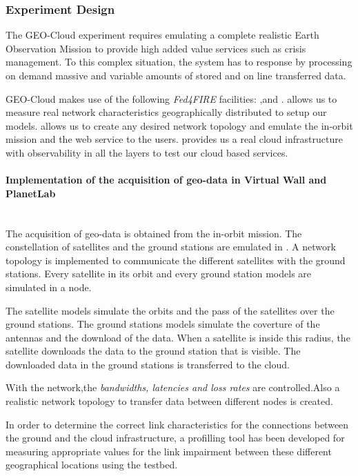 \subsubsection{Experiment Design}


The GEO-Cloud experiment requires emulating a complete realistic Earth Observation Mission to provide high added value services such as crisis management. To this complex situation, the system has to response by processing on demand massive and variable amounts of stored and on line transferred data.

GEO-Cloud makes use of the following \emph{Fed4FIRE} facilities: \pl,\vw and
\bonfire. \pl allows us to measure real network characteristics geographically
distributed to setup our models. \vw allows us to create any desired network
topology and emulate the in-orbit mission and the web service to the
users. \bonfire provides us a real cloud infrastructure with observability in
all the layers to test our cloud based services.


\paragraph{Implementation of the acquisition of geo-data in Virtual Wall and
  PlanetLab}~\\
The acquisition of geo-data is obtained from the in-orbit mission. The
constellation of satellites and the ground stations are emulated in \vw. A
network topology is implemented to communicate the different satellites with the ground stations. Every satellite in its orbit and every ground station models are simulated in a node.

The satellite models simulate the orbits and the pass of the satellites over the ground stations. The ground stations models simulate the coverture of the antennas and the download of the data. When a satellite is inside this radius, the satellite downloads the data to the ground station that is visible. The downloaded data in the ground stations is transferred to the \bonfire cloud.

With the \vw network,the \emph{bandwidths, latencies and loss rates} are
controlled.Also a realistic network topology to transfer data between different
nodes is created.

In order to determine the correct link characteristics for the connections
between the ground and the cloud infrastructure, a profilling tool has been
developed for measuring appropriate values for the link impairment between these different geographical locations using the \pl testbed.


